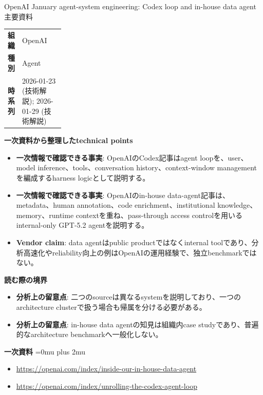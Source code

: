\begin{technicalnote}{OpenAI January agent-system engineering: Codex loop and in-house data agent}{主要資料}
\begingroup
\begin{tabularx}{\linewidth}{@{}>{\bfseries}p{0.22\linewidth}X@{}}
組織 & OpenAI \\
種別 & Agent \\
時系列 & 2026-01-23 (技術解説); 2026-01-29 (技術解説) \\
\end{tabularx}
\smallskip
{\bfseries 一次資料から整理したtechnical points}
\begin{itemize}[leftmargin=1.5em,itemsep=0.35em]
\item \textbf{一次情報で確認できる事実}: OpenAIのCodex記事はagent loopを、user、model inference、tools、conversation history、context-window managementを編成するharness logicとして説明する。
\item \textbf{一次情報で確認できる事実}: OpenAIのin-house data-agent記事は、metadata、human annotation、code enrichment、institutional knowledge、memory、runtime contextを重ね、pass-through access controlを用いるinternal-only GPT-5.2 agentを説明する。
\item \textbf{Vendor claim}: data agentはpublic productではなくinternal toolであり、分析高速化やreliability向上の例はOpenAIの運用経験で、独立benchmarkではない。
\end{itemize}
\begin{minipage}{\linewidth}
{\bfseries 読む際の境界}
\begin{itemize}[leftmargin=1.5em,itemsep=0.35em]
\item \textbf{分析上の留意点}: 二つのsourceは異なるsystemを説明しており、一つのarchitecture clusterで扱う場合も帰属を分ける必要がある。
\item \textbf{分析上の留意点}: in-house data agentの知見は組織内case studyであり、普遍的なarchitecture benchmarkへ一般化しない。
\end{itemize}
\begin{samepage}
{\bfseries 一次資料}
\begingroup\sloppy
\Urlmuskip=0mu plus 2mu\relax
\begin{itemize}[leftmargin=1.5em,itemsep=0.25em]
\item {\scriptsize\url{https://openai.com/index/inside-our-in-house-data-agent}}
\item {\scriptsize\url{https://openai.com/index/unrolling-the-codex-agent-loop}}
\end{itemize}
\endgroup
\end{samepage}
\end{minipage}
\endgroup
\end{technicalnote}
\medskip

